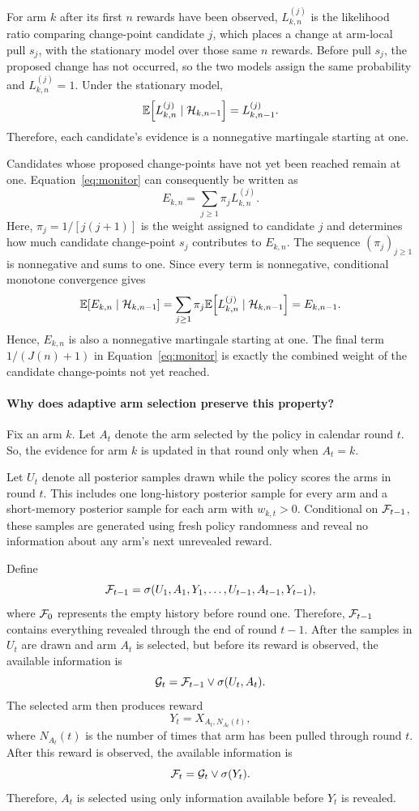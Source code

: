 For arm $k$ after its first $n$ rewards have been observed, $L_{k,n}^{(j)}$ is the likelihood ratio comparing change-point candidate $j$, which places a change at arm-local pull $s_j$, with the stationary model over those same $n$ rewards.
Before pull $s_j$, the proposed change has not occurred, so the two models assign the same probability and $L_{k,n}^{(j)}=1$.
Under the stationary model,
\[
\mathbb E\!\left[
L_{k,n}^{(j)}
\mid
\mathcal H_{k,n-1}
\right]
=
L_{k,n-1}^{(j)}.
\]
Therefore, each candidate's evidence is a nonnegative martingale starting at
one.

Candidates whose proposed change-points have not yet been reached remain at
one.
Equation~\eqref{eq:monitor} can consequently be written as
\[
E_{k,n}
=
\sum_{j\geq1}\pi_jL_{k,n}^{(j)}.
\]
Here, $\pi_j=1/[j(j+1)]$ is the weight assigned to candidate $j$ and
determines how much candidate change-point $s_j$ contributes to $E_{k,n}$.
The sequence $(\pi_j)_{j\geq1}$ is nonnegative and sums to one.
Since every term is nonnegative, conditional monotone convergence gives
\[
\mathbb E\!\left[E_{k,n}\mid\mathcal H_{k,n-1}\right]
=
\sum_{j\geq1}\pi_j
\mathbb E\!\left[
L_{k,n}^{(j)}
\mid
\mathcal H_{k,n-1}
\right]
=
E_{k,n-1}.
\]
Hence, $E_{k,n}$ is also a nonnegative martingale starting at one.
The final term $1/(J(n)+1)$ in Equation~\eqref{eq:monitor} is exactly the combined
weight of the candidate change-points not yet reached.

\paragraph{Why does adaptive arm selection preserve this property?}
Fix an arm $k$.
Let $A_t$ denote the arm selected by the policy in calendar round $t$.
So, the evidence for arm $k$ is updated in that round only when $A_t=k$.

Let $U_t$ denote all posterior samples drawn while the policy scores the arms
in round $t$.
This includes one long-history posterior sample for every arm and a short-memory posterior sample for each arm with $w_{k,t}>0$.
Conditional on $\mathcal F_{t-1}$, these samples are generated using fresh policy
randomness and reveal no information about any arm's next unrevealed reward.

Define
\[
\mathcal F_{t-1}
=
\sigma(U_1,A_1,Y_1,\ldots,U_{t-1},A_{t-1},Y_{t-1}),
\]
where $\mathcal F_0$ represents the empty history before round one.
Therefore, $\mathcal F_{t-1}$ contains everything revealed through the end of round $t-1$.
After the samples in $U_t$ are drawn and arm $A_t$ is selected, but before its
reward is observed, the available information is
\[
\mathcal G_t
=
\mathcal F_{t-1}\vee\sigma(U_t,A_t).
\]
The selected arm then produces reward
\[
Y_t=X_{A_t,N_{A_t}(t)},
\]
where $N_{A_t}(t)$ is the number of times that arm has been pulled through
round $t$.
After this reward is observed, the available information is
\[
\mathcal F_t
=
\mathcal G_t\vee\sigma(Y_t).
\]
Therefore, $A_t$ is selected using only information available before $Y_t$ is
revealed.

